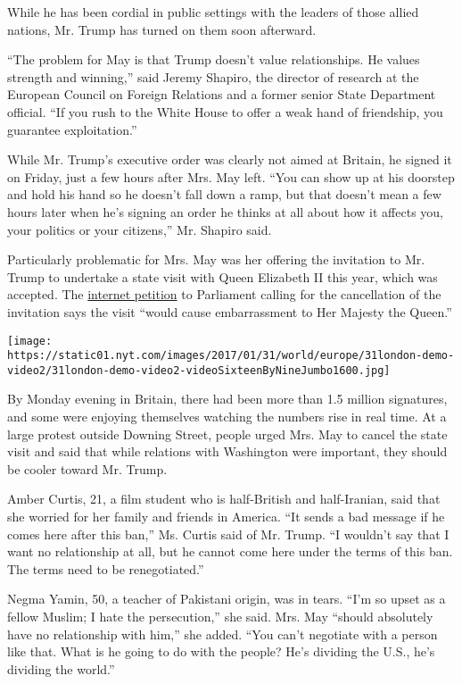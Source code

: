 While he has been cordial in public settings with the leaders of those
allied nations, Mr. Trump has turned on them soon afterward.

``The problem for May is that Trump doesn't value relationships. He
values strength and winning,'' said Jeremy Shapiro, the director of
research at the European Council on Foreign Relations and a former
senior State Department official. ``If you rush to the White House to
offer a weak hand of friendship, you guarantee exploitation.''

While Mr. Trump's executive order was clearly not aimed at Britain, he
signed it on Friday, just a few hours after Mrs. May left. ``You can
show up at his doorstep and hold his hand so he doesn't fall down a
ramp, but that doesn't mean a few hours later when he's signing an order
he thinks at all about how it affects you, your politics or your
citizens,'' Mr. Shapiro said.

Particularly problematic for Mrs. May was her offering the invitation to
Mr. Trump to undertake a state visit with Queen Elizabeth II this year,
which was accepted. The
\href{https://petition.parliament.uk/petitions/171928}{internet
petition} to Parliament calling for the cancellation of the invitation
says the visit ``would cause embarrassment to Her Majesty the Queen.''

\texttt{[image: https://static01.nyt.com/images/2017/01/31/world/europe/31london-demo-video2/31london-demo-video2-videoSixteenByNineJumbo1600.jpg]}

By Monday evening in Britain, there had been more than 1.5 million
signatures, and some were enjoying themselves watching the numbers rise
in real time. At a large protest outside Downing Street, people urged
Mrs. May to cancel the state visit and said that while relations with
Washington were important, they should be cooler toward Mr. Trump.

Amber Curtis, 21, a film student who is half-British and half-Iranian,
said that she worried for her family and friends in America. ``It sends
a bad message if he comes here after this ban,'' Ms. Curtis said of Mr.
Trump. ``I wouldn't say that I want no relationship at all, but he
cannot come here under the terms of this ban. The terms need to be
renegotiated.''

Negma Yamin, 50, a teacher of Pakistani origin, was in tears. ``I'm so
upset as a fellow Muslim; I hate the persecution,'' she said. Mrs. May
``should absolutely have no relationship with him,'' she added. ``You
can't negotiate with a person like that. What is he going to do with the
people? He's dividing the U.S., he's dividing the world.''

